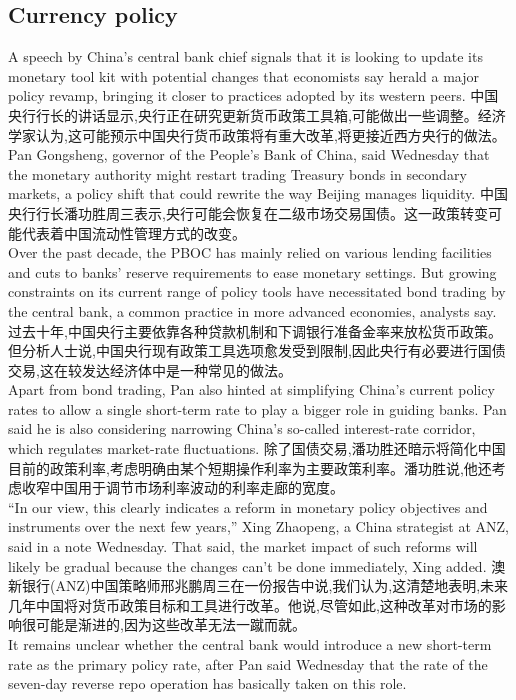 \documentclass[a4paper,12pt]{article}
\begin{document}
\subsection{Currency policy}
A speech by China's central bank chief signals that it is looking to update its monetary tool kit with potential changes that economists say herald a major policy revamp, bringing it closer to practices adopted by its western peers.
中国央行行长的讲话显示,央行正在研究更新货币政策工具箱,可能做出一些调整。经济学家认为,这可能预示中国央行货币政策将有重大改革,将更接近西方央行的做法。
\\Pan Gongsheng, governor of the People's Bank of China, said Wednesday that the monetary authority might restart trading Treasury bonds in secondary markets, a policy shift that could rewrite the way Beijing manages liquidity.
中国央行行长潘功胜周三表示,央行可能会恢复在二级市场交易国债。这一政策转变可能代表着中国流动性管理方式的改变。
\\Over the past decade, the PBOC has mainly relied on various lending facilities and cuts to banks' reserve requirements to ease monetary settings. But growing constraints on its current range of policy tools have necessitated bond trading by the central bank, a common practice in more advanced economies, analysts say.
过去十年,中国央行主要依靠各种贷款机制和下调银行准备金率来放松货币政策。但分析人士说,中国央行现有政策工具选项愈发受到限制,因此央行有必要进行国债交易,这在较发达经济体中是一种常见的做法。
\\Apart from bond trading, Pan also hinted at simplifying China's current policy rates to allow a single short-term rate to play a bigger role in guiding banks. Pan said he is also considering narrowing China's so-called interest-rate corridor, which regulates market-rate fluctuations.
除了国债交易,潘功胜还暗示将简化中国目前的政策利率,考虑明确由某个短期操作利率为主要政策利率。潘功胜说,他还考虑收窄中国用于调节市场利率波动的利率走廊的宽度。
\\“In our view, this clearly indicates a reform in monetary policy objectives and instruments over the next few years,” Xing Zhaopeng, a China strategist at ANZ, said in a note Wednesday. That said, the market impact of such reforms will likely be gradual because the changes can't be done immediately, Xing added.
澳新银行(ANZ)中国策略师邢兆鹏周三在一份报告中说,我们认为,这清楚地表明,未来几年中国将对货币政策目标和工具进行改革。他说,尽管如此,这种改革对市场的影响很可能是渐进的,因为这些改革无法一蹴而就。
\\It remains unclear whether the central bank would introduce a new short-term rate as the primary policy rate, after Pan said Wednesday that the rate of the seven-day reverse repo operation has basically taken on this role.
\end{document}
